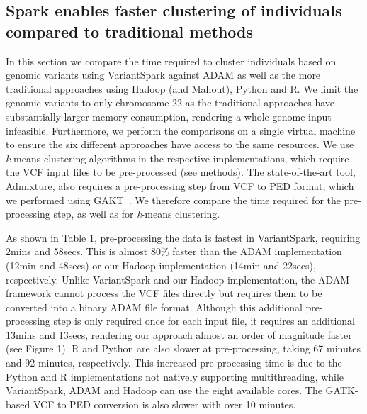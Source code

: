 \documentclass{bmcart}
\newcommand{\variantSpark}{{\sc VariantSpark}}
\newcommand{\kMeans}{\textit{k}-means}
\begin{document}
\subsection*{{\sc Spark} enables faster clustering of individuals compared to traditional methods}

In this section we compare the time required to cluster individuals based on genomic variants using \variantSpark{} against {\sc ADAM} as well as the more traditional approaches using Hadoop (and Mahout), Python and R. 
We limit the genomic variants to only chromosome 22 as the traditional approaches have substantially larger memory consumption, rendering a whole-genome input infeasible.  
Furthermore, we perform the comparisons on a single virtual machine to ensure the six different approaches have access to the same resources.
We use \kMeans{} clustering algorithms in the respective implementations, which require the VCF input files to be pre-processed (see methods). 
The state-of-the-art tool, {\sc Admixture}, also requires a pre-processing step from VCF to PED format, which we performed using GAKT~\cite{McKenna2010}.
We therefore compare the time required for the pre-processing step, as well as for \kMeans{} clustering.

As shown in Table 1, pre-processing the data is fastest in \variantSpark{}, requiring 2mins and 58secs. %
This is almost 80\% faster than the {\sc ADAM} implementation (12min and 48secs) %
or our Hadoop implementation (14min and 22secs), respectively. %
Unlike \variantSpark{} and our Hadoop implementation, the {\sc ADAM} framework cannot process the VCF files directly but requires them to be converted into a binary {\sc ADAM} file format. 
Although this additional pre-processing step is only required once for each input file, it requires an additional 13mins and 13secs, %
rendering our approach almost an order of magnitude faster (see Figure 1).
R and Python are also slower at pre-processing, taking 67 minutes and 92 minutes, respectively. 
This increased pre-processing time is due to the Python and R implementations not natively supporting multithreading, while \variantSpark{}, {\sc ADAM} and Hadoop can use the eight available cores.
The GATK-based VCF to PED conversion is also slower with over 10 minutes. 
\end{document}
